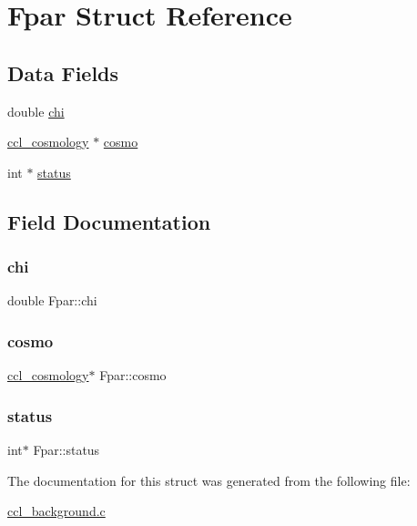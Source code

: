 \hypertarget{struct_fpar}{}\section{Fpar Struct Reference}
\label{struct_fpar}
\subsection*{Data Fields}
\begin{DoxyCompactItemize}
\item 
double \mbox{\hyperlink{struct_fpar_a81d7730539586a7dc1c60ef45e0f3cba}{chi}}
\item 
\mbox{\hyperlink{structccl__cosmology}{ccl\+\_\+cosmology}} $\ast$ \mbox{\hyperlink{struct_fpar_a996275af2d7ca615a0c4aa8fbc382218}{cosmo}}
\item 
int $\ast$ \mbox{\hyperlink{struct_fpar_adce795808a394aa0004e3d6c9e03d041}{status}}
\end{DoxyCompactItemize}


\subsection{Field Documentation}
\mbox{\label{struct_fpar_a81d7730539586a7dc1c60ef45e0f3cba}} 
\subsubsection{\texorpdfstring{chi}{chi}}
{\footnotesize\ttfamily double Fpar\+::chi}

\mbox{\label{struct_fpar_a996275af2d7ca615a0c4aa8fbc382218}} 
\subsubsection{\texorpdfstring{cosmo}{cosmo}}
{\footnotesize\ttfamily \mbox{\hyperlink{structccl__cosmology}{ccl\+\_\+cosmology}}$\ast$ Fpar\+::cosmo}

\mbox{\label{struct_fpar_adce795808a394aa0004e3d6c9e03d041}} 
\subsubsection{\texorpdfstring{status}{status}}
{\footnotesize\ttfamily int$\ast$ Fpar\+::status}



The documentation for this struct was generated from the following file\+:\begin{DoxyCompactItemize}
\item 
\mbox{\hyperlink{ccl__background_8c}{ccl\+\_\+background.\+c}}\end{DoxyCompactItemize}
